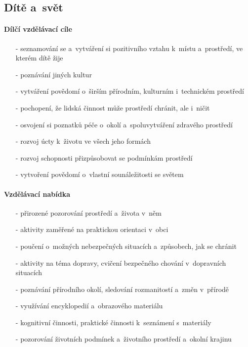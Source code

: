 			\subsection{Dítě a~svět}
				\textit{} \citep[s.~29]{RVP}

				\paragraph{Dílčí vzdělávací cíle}

				\begin{itemize}
				\setlength\itemsep{-2mm}
					\item[-]seznamování se a~vytváření si pozitivního vztahu k~místu a~prostředí, ve kterém dítě žije
					\item[-]poznávání jiných kultur
					\item[-]vytváření povědomí o~širším přírodním, kulturním i~technickém prostředí
					\item[-]pochopení, že lidská činnost může prostředí chránit, ale i~ničit
					\item[-]osvojení si poznatků péče o~okolí a~spoluvytváření zdravého prostředí
					\item[-]rozvoj úcty k~životu ve všech jeho formách
					\item[-]rozvoj schopnosti přizpůsobovat se podmínkám prostředí
					\item[-]vytvoření povědomí o~vlastní sounáležitosti se světem
				\end{itemize}
				
				\paragraph{Vzdělávací nabídka}

				\begin{itemize}
				\setlength\itemsep{-2mm}
					\item[-]přirozené pozorování prostředí a~života v~něm
					\item[-]aktivity zaměřené na praktickou orientaci v~obci
					\item[-]poučení o~možných nebezpečných situacích a~způsobech, jak se chránit
					\item[-]aktivity na téma dopravy, cvičení bezpečného chování v~dopravních situacích
					\item[-]poznávání přírodního okolí, sledování rozmanitostí a~změn v~přírodě
					\item[-]využívání encyklopedií a~obrazového materiálu
					\item[-]kognitivní činnosti, praktické činnosti k~seznámení s~materiály
					\item[-]pozorování životních podmínek a~životního prostředí a~okolní krajinu
				\end{itemize}
				
